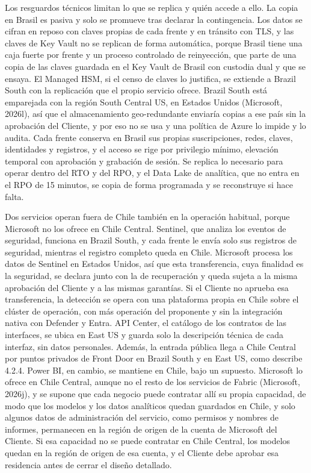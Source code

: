 \documentclass[11pt]{article}
\begin{document}
Los resguardos técnicos limitan lo que se replica y quién accede a ello. La copia en Brasil es pasiva y solo se promueve tras declarar la contingencia. Los datos se cifran en reposo con claves propias de cada frente y en tránsito con TLS, y las claves de Key Vault no se replican de forma automática, porque Brasil tiene una caja fuerte por frente y un proceso controlado de reinyección, que parte de una copia de las claves guardada en el Key Vault de Brasil con custodia dual y que se ensaya. El Managed HSM, si el censo de claves lo justifica, se extiende a Brazil South con la replicación que el propio servicio ofrece. Brazil South está emparejada con la región South Central US, en Estados Unidos (Microsoft, 2026l), así que el almacenamiento geo-redundante enviaría copias a ese país sin la aprobación del Cliente, y por eso no se usa y una política de Azure lo impide y lo audita. Cada frente conserva en Brasil sus propias suscripciones, redes, claves, identidades y registros, y el acceso se rige por privilegio mínimo, elevación temporal con aprobación y grabación de sesión. Se replica lo necesario para operar dentro del RTO y del RPO, y el Data Lake de analítica, que no entra en el RPO de 15 minutos, se copia de forma programada y se reconstruye si hace falta.

Dos servicios operan fuera de Chile también en la operación habitual, porque Microsoft no los ofrece en Chile Central. Sentinel, que analiza los eventos de seguridad, funciona en Brazil South, y cada frente le envía solo sus registros de seguridad, mientras el registro completo queda en Chile. Microsoft procesa los datos de Sentinel en Estados Unidos, así que esta transferencia, cuya finalidad es la seguridad, se declara junto con la de recuperación y queda sujeta a la misma aprobación del Cliente y a las mismas garantías. Si el Cliente no aprueba esa transferencia, la detección se opera con una plataforma propia en Chile sobre el clúster de operación, con más operación del proponente y sin la integración nativa con Defender y Entra. API Center, el catálogo de los contratos de las interfaces, se ubica en East US y guarda solo la descripción técnica de cada interfaz, sin datos personales. Además, la entrada pública llega a Chile Central por puntos privados de Front Door en Brazil South y en East US, como describe 4.2.4. Power BI, en cambio, se mantiene en Chile, bajo un supuesto. Microsoft lo ofrece en Chile Central, aunque no el resto de los servicios de Fabric (Microsoft, 2026j), y se supone que cada negocio puede contratar allí su propia capacidad, de modo que los modelos y los datos analíticos quedan guardados en Chile, y solo algunos datos de administración del servicio, como permisos y nombres de informes, permanecen en la región de origen de la cuenta de Microsoft del Cliente. Si esa capacidad no se puede contratar en Chile Central, los modelos quedan en la región de origen de esa cuenta, y el Cliente debe aprobar esa residencia antes de cerrar el diseño detallado.
\end{document}

